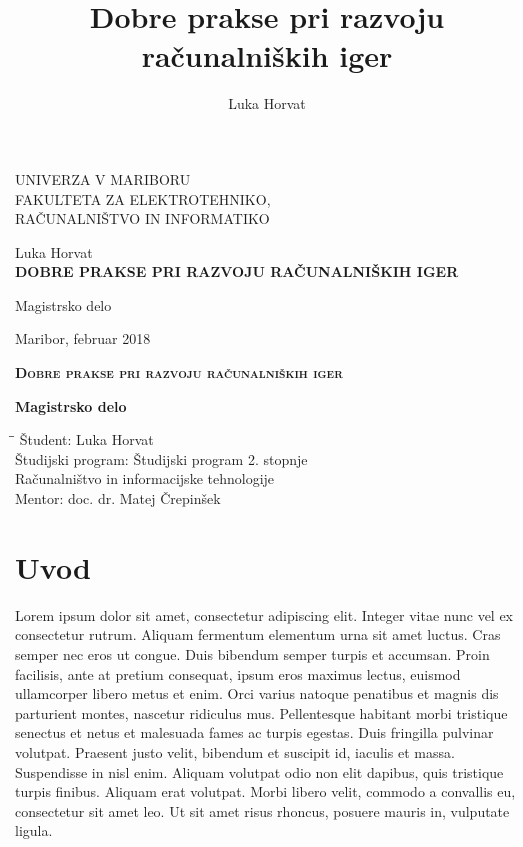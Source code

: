 \documentclass[12pt,a4paper,twoside]{book}
\author{Luka Horvat}
\title{Dobre prakse pri razvoju računalniških iger}
\begin{document}
	
\thispagestyle{empty} 

\begin{center}
{\large 
UNIVERZA V MARIBORU\\
FAKULTETA ZA ELEKTROTEHNIKO,\\
RAČUNALNIŠTVO IN INFORMATIKO\\
}

\vspace{\fill}
{\LARGE Luka Horvat}\\

\vspace{1cm}
\textsc{\textbf{\LARGE
		DOBRE PRAKSE PRI RAZVOJU RAČUNALNIŠKIH IGER\\
	}}

\vspace{1cm}
{\LARGE Magistrsko delo}

\vfill
{\Large Maribor, februar 2018}
\newpage
\end{center}

\begin{center}	
\vspace*{\fill}
\textsc{\textbf{\LARGE
		Dobre prakse pri razvoju računalniških iger\\
	}}
{\large\textbf{Magistrsko delo\\}
	
}
\vspace{\fill}
\begin{tabbing}
\hspace*{4cm}\=\hspace*{3cm}\= \kill
Študent: \> Luka Horvat\\
Študijski program: \> Študijski program 2. stopnje\\
\>Računalništvo in informacijske tehnologije\\
Mentor: \> doc. dr. Matej Črepinšek
\end{tabbing}
\newpage

\end{center}

\tableofcontents
\newpage

\chapter{Uvod}
Lorem ipsum dolor sit amet, consectetur adipiscing elit. Integer vitae nunc vel ex consectetur rutrum. Aliquam fermentum elementum urna sit amet luctus. Cras semper nec eros ut congue. Duis bibendum semper turpis et accumsan. Proin facilisis, ante at pretium consequat, ipsum eros maximus lectus, euismod ullamcorper libero metus et enim. Orci varius natoque penatibus et magnis dis parturient montes, nascetur ridiculus mus. Pellentesque habitant morbi tristique senectus et netus et malesuada fames ac turpis egestas. Duis fringilla pulvinar volutpat. Praesent justo velit, bibendum et suscipit id, iaculis et massa. Suspendisse in nisl enim. Aliquam volutpat odio non elit dapibus, quis tristique turpis finibus. Aliquam erat volutpat. Morbi libero velit, commodo a convallis eu, consectetur sit amet leo. Ut sit amet risus rhoncus, posuere mauris in, vulputate ligula.
\end{document}
